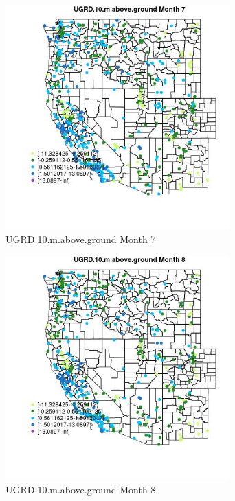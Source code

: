 \begin{figure} 
\centering  
\includegraphics[width=0.77\textwidth]{Code_Outputs/Report_ML_input_PM25_Step4_part_e_de_duplicated_aves_compiled_2019-05-14wNAs_MapObsMo7UGRD10maboveground.jpg} 
\caption{\label{fig:Report_ML_input_PM25_Step4_part_e_de_duplicated_aves_compiled_2019-05-14wNAsMapObsMo7UGRD10maboveground}UGRD.10.m.above.ground Month 7} 
\end{figure} 
 

\begin{figure} 
\centering  
\includegraphics[width=0.77\textwidth]{Code_Outputs/Report_ML_input_PM25_Step4_part_e_de_duplicated_aves_compiled_2019-05-14wNAs_MapObsMo8UGRD10maboveground.jpg} 
\caption{\label{fig:Report_ML_input_PM25_Step4_part_e_de_duplicated_aves_compiled_2019-05-14wNAsMapObsMo8UGRD10maboveground}UGRD.10.m.above.ground Month 8} 
\end{figure} 
 


